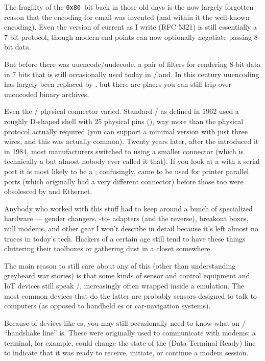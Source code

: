 The fragility of the {\tt 0x80}~bit back in those old days is the now largely
forgotten reason that the  encoding for email was invented (and within it
the well-known  encoding). Even the version of  current as I write
(RFC 5321) is still essentially a 7-bit protocol, though modern end points can
now optionally negotiate passing 8-bit data.

But before  there was uuencode/uudecode, a pair of filters for rendering
8-bit data in 7 bits that is still occasionally used today in \UNIX/land. In this
century uuencoding has largely been replaced by , but there are places
you can still trip over uuencoded binary archives.

Even the \RSTTT/ physical connector varied. Standard \RSTTT/ as defined in 1962
used a roughly D-shaped shell with 25 physical pins (), way more than the
physical protocol actually required (you can support a minimal version with
just three wires, and this was actually common). Twenty years later, after the
 introduced it in 1984, most manufacturers switched to using a smaller
 connector (which is technically a  but almost nobody ever called it
that). If you look at a  with a serial port it is most likely to be a ;
confusingly,  came to be used for printer parallel ports (which originally
had a very different connector) before those too were obsolesced by  and
Ethernet.

Anybody who worked with this stuff had to keep around a bunch of specialized
hardware --- gender changers, -to- adapters (and the reverse), breakout
boxes, null modems, and other gear I won't describe in detail because it's left
almost no traces in today's tech. Hackers of a certain age still tend to have
these things cluttering their toolboxes or gathering dust in a closet
somewhere.

The main reason to still care about any of this (other than understanding
greybeard war stories) is that some kinds of sensor and control equipment and
IoT devices still speak \RSTTT/, increasingly often wrapped inside a 
emulation. The most common devices that do the latter are probably  sensors
designed to talk to computers (as opposed to handheld es or car-navigation
systems).

Because of devices like es, you may still occasionally need to know what an
\RSTTT/ ``handshake line'' is. These were originally used to communicate with
modems; a terminal, for example, could change the state of the  (Data
Terminal Ready) line to indicate that it was ready to receive, initiate, or
continue a modem session.

